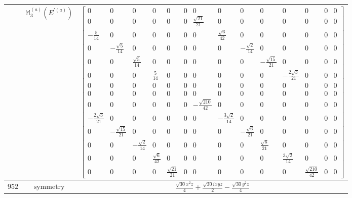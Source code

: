 \documentclass[fleqn,8pt,landscape]{jsarticle}
\begin{document}
\begin{longtable}{ccc}
$  $ & $ \mathbb{M}_{3}^{(a)}(E^{\prime(a)}) $ & $ \begin{bmatrix} 0 & 0 & 0 & 0 & 0 & 0 & 0 & 0 & 0 & 0 & 0 & 0 & 0 & 0 \\ 0 & 0 & 0 & 0 & 0 & 0 & \frac{\sqrt{21}}{21} & 0 & 0 & 0 & 0 & 0 & 0 & 0 \\ - \frac{5}{14} & 0 & 0 & 0 & 0 & 0 & 0 & \frac{\sqrt{6}}{42} & 0 & 0 & 0 & 0 & 0 & 0 \\ 0 & - \frac{\sqrt{5}}{14} & 0 & 0 & 0 & 0 & 0 & 0 & - \frac{\sqrt{2}}{14} & 0 & 0 & 0 & 0 & 0 \\ 0 & 0 & \frac{\sqrt{5}}{14} & 0 & 0 & 0 & 0 & 0 & 0 & - \frac{\sqrt{15}}{21} & 0 & 0 & 0 & 0 \\ 0 & 0 & 0 & \frac{5}{14} & 0 & 0 & 0 & 0 & 0 & 0 & - \frac{2 \sqrt{3}}{21} & 0 & 0 & 0 \\ 0 & 0 & 0 & 0 & 0 & 0 & 0 & 0 & 0 & 0 & 0 & 0 & 0 & 0 \\ 0 & 0 & 0 & 0 & 0 & 0 & 0 & 0 & 0 & 0 & 0 & 0 & 0 & 0 \\ 0 & 0 & 0 & 0 & 0 & 0 & - \frac{\sqrt{210}}{42} & 0 & 0 & 0 & 0 & 0 & 0 & 0 \\ - \frac{2 \sqrt{3}}{21} & 0 & 0 & 0 & 0 & 0 & 0 & - \frac{3 \sqrt{2}}{14} & 0 & 0 & 0 & 0 & 0 & 0 \\ 0 & - \frac{\sqrt{15}}{21} & 0 & 0 & 0 & 0 & 0 & 0 & - \frac{\sqrt{6}}{21} & 0 & 0 & 0 & 0 & 0 \\ 0 & 0 & - \frac{\sqrt{2}}{14} & 0 & 0 & 0 & 0 & 0 & 0 & \frac{\sqrt{6}}{21} & 0 & 0 & 0 & 0 \\ 0 & 0 & 0 & \frac{\sqrt{6}}{42} & 0 & 0 & 0 & 0 & 0 & 0 & \frac{3 \sqrt{2}}{14} & 0 & 0 & 0 \\ 0 & 0 & 0 & 0 & \frac{\sqrt{21}}{21} & 0 & 0 & 0 & 0 & 0 & 0 & \frac{\sqrt{210}}{42} & 0 & 0 \end{bmatrix} $ \\ \hline
$ 952 $ & $ \text{symmetry} $ & $ \frac{\sqrt{30} x^{2} z}{4} + \frac{\sqrt{30} i x y z}{2} - \frac{\sqrt{30} y^{2} z}{4} $ \\

\end{longtable}
\end{document}
